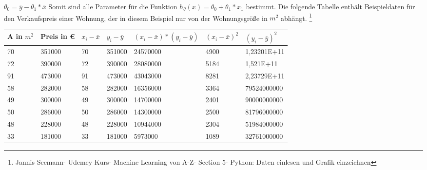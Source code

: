 \documentclass[a4paper]{scrreprt}
\begin{document}
\begin{enumerate}
$\theta_{0}=\bar{y}-\theta_{1}*\bar{x}$\newline
Somit sind alle Parameter für die Funktion $h_{\theta}(x)=\theta_{0}+\theta_{1}*x_{1}$ bestimmt.\newline
Die folgende Tabelle enthält Beispieldaten für den Verkaufspreis einer Wohnung, der in diesem Beispiel nur von der Wohnungsgröße in $m^{2}$ abhängt.
\footnote{Jannis Seemann- Udemey Kurs- Machine Learning von A-Z- Section 5- Python: Daten einlesen und Grafik einzeichnen}
\newpage
\begin{table}
	\centering
	\label{Manuelle Regression}
\begin{tiny}
\begin{tabular}{lllllll}
\toprule
\textbf{A} in $m^{2}$ & \textbf{Preis} in \euro{} & $x_i-\bar{x}$ & $y_i-\bar{y}$ & $(x_i-\bar{x})*(y_i-\bar{y})$ & $(x_i-\bar{x})^{2}$ & $(y_i-\bar{y})^{2}$  \\
\midrule
70                    & 351000                 & 70                  & 351000              & 24570000                                    & 4900                    & 1,23201E+11             \\
72                    & 390000                 & 72                  & 390000              & 28080000                                    & 5184                    & 1,521E+11               \\
91                    & 473000                 & 91                  & 473000              & 43043000                                    & 8281                    & 2,23729E+11             \\
58                    & 282000                 & 58                  & 282000              & 16356000                                    & 3364                    & 79524000000             \\
49                    & 300000                 & 49                  & 300000              & 14700000                                    & 2401                    & 90000000000             \\
50                    & 286000                 & 50                  & 286000              & 14300000                                    & 2500                    & 81796000000             \\
48                    & 228000                 & 48                  & 228000              & 10944000                                    & 2304                    & 51984000000             \\
33                    & 181000                 & 33                  & 181000              & 5973000                                     & 1089                    & 32761000000             \\

\end{tabular}
\end{tiny}
\end{table}
\end{enumerate}
\end{document}
